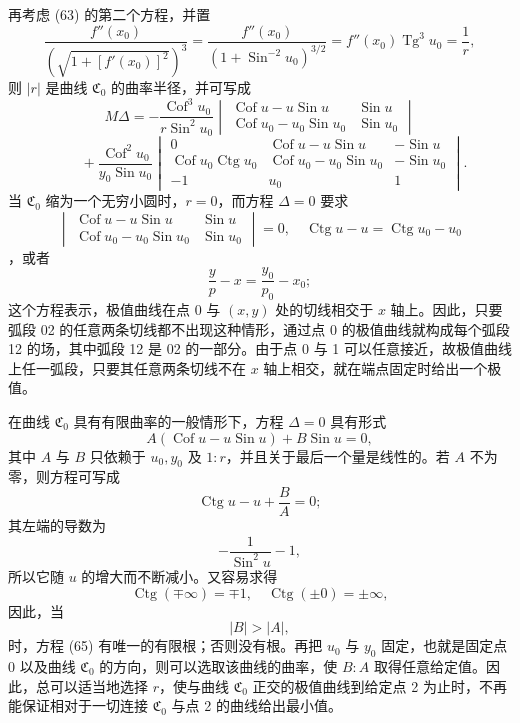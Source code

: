\documentclass[11pt,a4paper,leqno]{article}
\newcommand{\Cof}{\operatorname{Cof}}
\newcommand{\Sin}{\operatorname{Sin}}
\newcommand{\Tg}{\operatorname{Tg}}
\newcommand{\Ctg}{\operatorname{Ctg}}
\begin{document}
再考虑 (63) 的第二个方程，并置
\[
\frac{f''(x_0)}{\left(\sqrt{1+[f'(x_0)]^2}\right)^3}
=
\frac{f''(x_0)}{(1+\Sin^{-2}u_0)^{3/2}}
=
f''(x_0)\Tg^3u_0
=
\frac{1}{r},
\]
则 $|r|$ 是曲线 $\mathfrak{C}_0$ 的曲率半径，并可写成
\[
M\Delta
=
-\frac{\Cof^3u_0}{r\Sin^2u_0}
\begin{vmatrix}
\Cof u-u\Sin u & \Sin u\\
\Cof u_0-u_0\Sin u_0 & \Sin u_0
\end{vmatrix}
\]
\[
\qquad
+\frac{\Cof^2u_0}{y_0\Sin u_0}
\begin{vmatrix}
0 & \Cof u-u\Sin u & -\Sin u\\
\Cof u_0\Ctg u_0 & \Cof u_0-u_0\Sin u_0 & -\Sin u_0\\
-1 & u_0 & 1
\end{vmatrix}.
\]
当 $\mathfrak{C}_0$ 缩为一个无穷小圆时，$r=0$，而方程 $\Delta=0$ 要求
\[
\begin{vmatrix}
\Cof u-u\Sin u & \Sin u\\
\Cof u_0-u_0\Sin u_0 & \Sin u_0
\end{vmatrix}
=0,\quad
\Ctg u-u=\Ctg u_0-u_0
\]
，或者
\[
\frac{y}{p}-x=\frac{y_0}{p_0}-x_0;
\]
这个方程表示，极值曲线在点 0 与 $(x,y)$ 处的切线相交于 $x$ 轴上。因此，只要弧段 02 的任意两条切线都不出现这种情形，通过点 0 的极值曲线就构成每个弧段 12 的场，其中弧段 12 是 02 的一部分。由于点 0 与 1 可以任意接近，故极值曲线上任一弧段，只要其任意两条切线不在 $x$ 轴上相交，就在端点固定时给出一个极值。

在曲线 $\mathfrak{C}_0$ 具有有限曲率的一般情形下，方程 $\Delta=0$ 具有形式
\[
A(\Cof u-u\Sin u)+B\Sin u=0,
\]
其中 $A$ 与 $B$ 只依赖于 $u_0,y_0$ 及 $1:r$，并且关于最后一个量是线性的。若 $A$ 不为零，则方程可写成
\begin{equation}\tag{65}
\Ctg u-u+\frac{B}{A}=0;
\end{equation}
其左端的导数为
\[
-\frac{1}{\Sin^2u}-1,
\]
所以它随 $u$ 的增大而不断减小。又容易求得
\[
\Ctg(\mp\infty)=\mp1,\quad \Ctg(\pm0)=\pm\infty,
\]
因此，当
\[
|B|>|A|,
\]
时，方程 (65) 有唯一的有限根；否则没有根。再把 $u_0$ 与 $y_0$ 固定，也就是固定点 0 以及曲线 $\mathfrak{C}_0$ 的方向，则可以选取该曲线的曲率，使 $B:A$ 取得任意给定值。因此，总可以适当地选择 $r$，使与曲线 $\mathfrak{C}_0$ 正交的极值曲线到给定点 2 为止时，不再能保证相对于一切连接 $\mathfrak{C}_0$ 与点 2 的曲线给出最小值。
\end{document}
